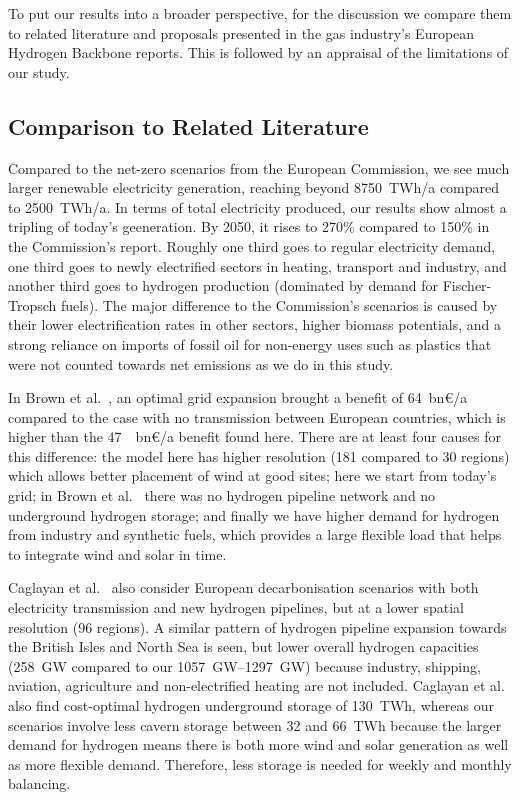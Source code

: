 To put our results into a broader perspective, for the discussion we compare
them to related literature and proposals presented in the gas industry's
European Hydrogen Backbone reports. This is followed by an appraisal of the
limitations of our study.

\subsection*{Comparison to Related Literature}

Compared to the net-zero scenarios from the European
Commission\cite{in-depth_2018}, we see much larger renewable electricity
generation, reaching beyond 8750~TWh/a compared to 2500~TWh/a.\cite{in-depth_2018} In terms of total electricity produced, our results show
almost a tripling of today's geeneration. By 2050, it rises to 270\% compared to 150\%
in the Commission's report.\cite{in-depth_2018} Roughly one third goes to regular
electricity demand, one third goes to newly electrified sectors in heating,
transport and industry, and another third goes to hydrogen production (dominated by
demand for Fischer-Tropsch fuels). The major difference to the Commission's
scenarios\cite{in-depth_2018} is caused by their lower electrification rates in
other sectors, higher biomass potentials, and a strong reliance on imports of
fossil oil for non-energy uses such as plastics that were not counted towards
net emissions as we do in this study.

In Brown et al.~\cite{brownSynergiesSector2018}, an optimal grid expansion
brought a benefit of 64~bn\euro/a compared to the case with no
transmission between European countries, which is higher than the
47~~bn\euro/a benefit found here. There are at least four causes for
this difference: the model here has higher resolution (181 compared to 30
regions) which allows better placement of wind at good sites; here we start from
today's grid; in Brown et al.~\cite{brownSynergiesSector2018} there was no
hydrogen pipeline network and no underground hydrogen storage; and finally we
have higher demand for hydrogen from industry and synthetic fuels, which
provides a large flexible load that helps to integrate wind and solar in time.

Caglayan et al.~\cite{Caglayan2019} also consider European decarbonisation
scenarios with both electricity transmission and new hydrogen pipelines, but at
a lower spatial resolution (96 regions). A similar pattern of hydrogen pipeline
expansion towards the British Isles and North Sea is seen, but lower overall
hydrogen capacities (258~GW compared to our \SIrange{1057}{1297}{\giga\watt})
because industry, shipping, aviation, agriculture and non-electrified heating
are not included. Caglayan et al.~\cite{Caglayan2019} also find cost-optimal
hydrogen underground storage of 130~TWh, whereas our scenarios involve less
cavern storage between 32 and 66~TWh because the larger demand for hydrogen
means there is both more wind and solar generation as well as more flexible demand.
Therefore, less storage is needed for weekly and monthly balancing.


